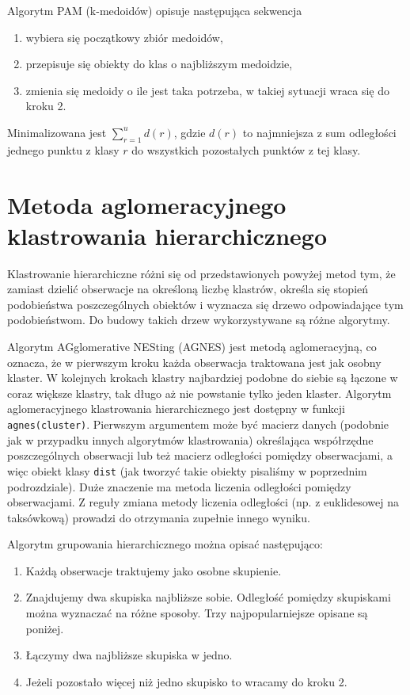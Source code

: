 \documentclass[polish,]{book}
\begin{document}
Algorytm PAM (k-medoidów) opisuje następująca sekwencja

\begin{enumerate}
\def\labelenumi{\arabic{enumi}.}
\item
  wybiera się początkowy zbiór medoidów,
\item
  przepisuje się obiekty do klas o najbliższym medoidzie,
\item
  zmienia się medoidy o ile jest taka potrzeba, w takiej sytuacji wraca się do
  kroku 2.
\end{enumerate}

Minimalizowana jest \(\sum_{r=1}^{u}d(r)\), gdzie \(d(r)\) to najmniejsza z sum odległości jednego punktu z klasy \(r\) do wszystkich pozostałych punktów z tej klasy.

\hypertarget{part_33}{%
\section{Metoda aglomeracyjnego klastrowania hierarchicznego}\label{part_33}}

Klastrowanie hierarchiczne różni się od przedstawionych powyżej metod tym, że
zamiast dzielić obserwacje na określoną liczbę klastrów, określa się stopień podobieństwa poszczególnych obiektów i wyznacza się drzewo odpowiadające tym podobieństwom. Do budowy takich drzew wykorzystywane są różne algorytmy.

Algorytm AGglomerative NESting (AGNES) jest metodą aglomeracyjną, co oznacza, że w pierwszym kroku każda obserwacja traktowana jest jak osobny klaster.
W kolejnych krokach klastry najbardziej podobne do siebie są łączone w coraz większe klastry, tak długo aż nie powstanie tylko jeden klaster. Algorytm aglomeracyjnego klastrowania hierarchicznego jest dostępny w funkcji \texttt{agnes(cluster)}. Pierwszym argumentem może być macierz danych (podobnie jak w przypadku innych algorytmów klastrowania) określająca współrzędne poszczególnych obserwacji lub też
macierz odległości pomiędzy obserwacjami, a więc obiekt klasy \texttt{dist} (jak tworzyć
takie obiekty pisaliśmy w poprzednim podrozdziale). Duże znaczenie ma metoda
liczenia odległości pomiędzy obserwacjami. Z reguły zmiana metody liczenia odległości (np. z euklidesowej na taksówkową) prowadzi do otrzymania zupełnie innego wyniku.

Algorytm grupowania hierarchicznego można opisać następująco:

\begin{enumerate}
\def\labelenumi{\arabic{enumi}.}
\item
  Każdą obserwacje traktujemy jako osobne skupienie.
\item
  Znajdujemy dwa skupiska najbliższe sobie. Odległość pomiędzy skupiskami
  można wyznaczać na różne sposoby. Trzy najpopularniejsze opisane są poniżej.
\item
  Łączymy dwa najbliższe skupiska w jedno.
\item
  Jeżeli pozostało więcej niż jedno skupisko to wracamy do kroku 2.
\end{enumerate}
\end{document}
